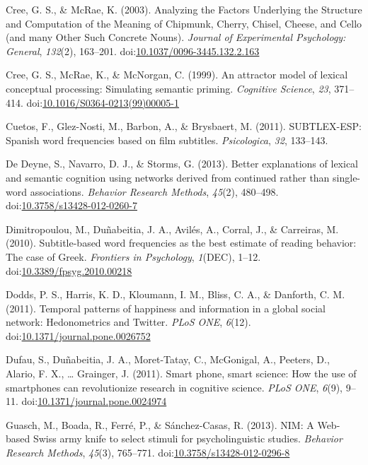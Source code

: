 \documentclass[english,man]{apa6}
\theoremstyle{definition}
\theoremstyle{definition}
\theoremstyle{definition}
\theoremstyle{remark}
\begin{document}
\hypertarget{ref-Cree2003}{}
Cree, G. S., \& McRae, K. (2003). Analyzing the Factors Underlying the
Structure and Computation of the Meaning of Chipmunk, Cherry, Chisel,
Cheese, and Cello (and many Other Such Concrete Nouns). \emph{Journal of
Experimental Psychology: General}, \emph{132}(2), 163--201.
doi:\href{https://doi.org/10.1037/0096-3445.132.2.163}{10.1037/0096-3445.132.2.163}

\hypertarget{ref-Cree1999}{}
Cree, G. S., McRae, K., \& McNorgan, C. (1999). An attractor model of
lexical conceptual processing: Simulating semantic priming.
\emph{Cognitive Science}, \emph{23}, 371--414.
doi:\href{https://doi.org/10.1016/S0364-0213(99)00005-1}{10.1016/S0364-0213(99)00005-1}

\hypertarget{ref-Cuetos2011}{}
Cuetos, F., Glez-Nosti, M., Barbon, A., \& Brysbaert, M. (2011).
SUBTLEX-ESP: Spanish word frequencies based on film subtitles.
\emph{Psicologica}, \emph{32}, 133--143.

\hypertarget{ref-DeDeyne2013}{}
De Deyne, S., Navarro, D. J., \& Storms, G. (2013). Better explanations
of lexical and semantic cognition using networks derived from continued
rather than single-word associations. \emph{Behavior Research Methods},
\emph{45}(2), 480--498.
doi:\href{https://doi.org/10.3758/s13428-012-0260-7}{10.3758/s13428-012-0260-7}

\hypertarget{ref-Dimitropoulou2010}{}
Dimitropoulou, M., Duñabeitia, J. A., Avilés, A., Corral, J., \&
Carreiras, M. (2010). Subtitle-based word frequencies as the best
estimate of reading behavior: The case of Greek. \emph{Frontiers in
Psychology}, \emph{1}(DEC), 1--12.
doi:\href{https://doi.org/10.3389/fpsyg.2010.00218}{10.3389/fpsyg.2010.00218}

\hypertarget{ref-Dodds2011}{}
Dodds, P. S., Harris, K. D., Kloumann, I. M., Bliss, C. A., \& Danforth,
C. M. (2011). Temporal patterns of happiness and information in a global
social network: Hedonometrics and Twitter. \emph{PLoS ONE},
\emph{6}(12).
doi:\href{https://doi.org/10.1371/journal.pone.0026752}{10.1371/journal.pone.0026752}

\hypertarget{ref-Dufau2011}{}
Dufau, S., Duñabeitia, J. A., Moret-Tatay, C., McGonigal, A., Peeters,
D., Alario, F. X., \ldots{} Grainger, J. (2011). Smart phone, smart
science: How the use of smartphones can revolutionize research in
cognitive science. \emph{PLoS ONE}, \emph{6}(9), 9--11.
doi:\href{https://doi.org/10.1371/journal.pone.0024974}{10.1371/journal.pone.0024974}

\hypertarget{ref-Guasch2013}{}
Guasch, M., Boada, R., Ferré, P., \& Sánchez-Casas, R. (2013). NIM: A
Web-based Swiss army knife to select stimuli for psycholinguistic
studies. \emph{Behavior Research Methods}, \emph{45}(3), 765--771.
doi:\href{https://doi.org/10.3758/s13428-012-0296-8}{10.3758/s13428-012-0296-8}
\end{document}

